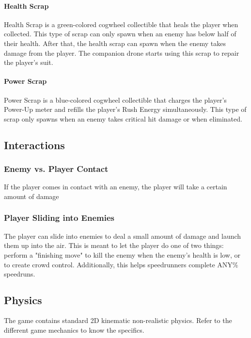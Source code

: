 \documentclass[12pt]{article}
\begin{document}
\paragraph{Health Scrap}

Health Scrap is a green-colored cogwheel collectible that heals the player when collected. This type of scrap can only spawn when an enemy has below half of their health. After that, the health scrap can spawn when the enemy takes damage from the player. The companion drone starts using this scrap to repair the player's suit. 

\paragraph{Power Scrap}

Power Scrap is a blue-colored cogwheel collectible that charges the player's Power-Up meter and refills the player's Rush Energy simultaneously. This type of scrap only spawns when an enemy takes critical hit damage or when eliminated.

\subsection{Interactions}

\subsubsection{Enemy vs. Player Contact}

If the player comes in contact with an enemy, the player will take a certain amount of damage

\subsubsection{Player Sliding into Enemies}

The player can slide into enemies to deal a small amount of damage and launch them up into the air. This is meant to let the player do one of two things: perform a "finishing move" to kill the enemy when the enemy's health is low, or to create crowd control. Additionally, this helps speedrunners complete ANY\% speedruns. 

\subsection{Physics}

The game contains standard 2D kinematic non-realistic physics. Refer to the different game mechanics to know the specifics.
\end{document}
